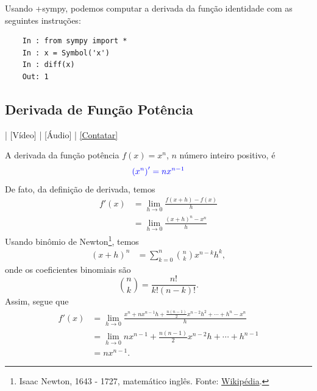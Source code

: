 \ifispython
\begin{ex}
  Usando {\python}+{sympy}, podemos computar a derivada da função identidade com as seguintes instruções:
  \begin{lstlisting}
    In : from sympy import *
    In : x = Symbol('x')
    In : diff(x)
    Out: 1
  \end{lstlisting}
\end{ex}
\fi

\subsection{Derivada de Função Potência}

\begin{flushright}
  [YouTube] | [Vídeo] | [Áudio] | \href{https://phkonzen.github.io/notas/contato.html}{[Contatar]}
\end{flushright}

A derivada da função potência $f(x) = x^n$, $n$ número inteiro positivo, é
\begin{equation}
  {\color{blue}\left(x^n\right)' = nx^{n-1}}
\end{equation}
De fato, da definição de derivada, temos
\begin{align}
  f'(x) &= \lim_{h\to 0} \frac{f(x+h)-f(x)}{h}\\
        &= \lim_{h\to 0} \frac{(x+h)^n-x^n}{h}
\end{align}
Usando binômio de Newton\footnote{Isaac Newton, 1643 - 1727, matemático inglês. Fonte: \href{https://pt.wikipedia.org/wiki/Isaac_Newton}{Wikipédia}.}, temos
\begin{align}
  (x+h)^n &= \sum_{k=0}^n \binom{n}{k}x^{n-k}h^k,
\end{align}
onde os coeficientes binomiais são
\begin{equation}
  \binom{n}{k} = \frac{n!}{k!(n-k)!}.
\end{equation}
Assim, segue que
\begin{align}
  f'(x) &= \lim_{h\to 0} \frac{x^n+nx^{n-1}h+\frac{n(n-1)}{2}x^{n-2}h^2 + \cdots +h^n-x^n}{h}\\
        &= \lim_{h\to 0} nx^{n-1}+\frac{n(n-1)}{2}x^{n-2}h+\cdots+h^{n-1}\\
        &= nx^{n-1}.
\end{align}

